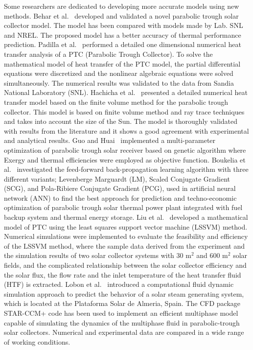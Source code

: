Some researchers are dedicated to developing more accurate models using new methods. Behar et al.~\cite{Behar2015} developed and validated a novel parabolic trough solar collector model. The model has been compared with models made by Lab. SNL and NREL. The proposed model has a better accuracy of thermal performance prediction.
Padilla et al.~\cite{Padilla2011} performed a detailed one dimensional numerical heat transfer analysis of a PTC (Parabolic Trough Collector). To solve the mathematical model of heat transfer of the PTC model, the partial differential equations were discretized and the nonlinear algebraic equations were solved simultaneously. The numerical results was validated to the data from Sandia National Laboratory (SNL).
Hachicha et al.~\cite{Hachicha2013} presented a detailed numerical heat transfer model based on the finite volume method for the parabolic trough collector.  This model is based on finite volume method and ray trace techniques and takes into account the size of the Sun.  The model is thoroughly validated with results from the literature and it shows a good agreement with experimental and analytical results.
Guo and Huai~\cite{JiangfengGuo2016-2} implemented a multi-parameter optimization of parabolic trough solar receiver based on genetic algorithm where Exergy and thermal efficiencies were employed as objective function.
Boukelia et al.~\cite{Boukelia2016} investigated the feed-forward back-propagation learning algorithm with three different variants; Levenberge Marguardt (LM), Scaled Conjugate Gradient (SCG), and Pola-Ribiere Conjugate Gradient (PCG), used in artificial neural network (ANN) to find the best approach for prediction and techno-economic optimization of parabolic trough solar thermal power plant integrated with fuel backup system and thermal energy storage.
Liu et al.~\cite{Liu2012} developed a mathematical model of PTC using the least squares support vector machine (LSSVM) method. Numerical simulations were implemented to evaluate the feasibility and efficiency of the LSSVM method, where the sample data derived from the experiment and the simulation results of two solar collector systems with 30 m$^2$ and 600 m$^2$ solar fields, and the complicated relationship between the solar collector efficiency and the solar flux, the flow rate and the inlet temperature of the heat transfer fluid (HTF) is extracted.
Lobon et al.~\cite{Lobon2014} introduced a computational fluid dynamic simulation approach to predict the behavior of a solar steam generating system, which is located at the Plataforma Solar de Almeria, Spain. The CFD package STAR-CCM+ code has been used to implement an efficient multiphase model capable of simulating the dynamics of the multiphase fluid in parabolic-trough solar collectors. Numerical and experimental data are compared in a wide range of working conditions.
